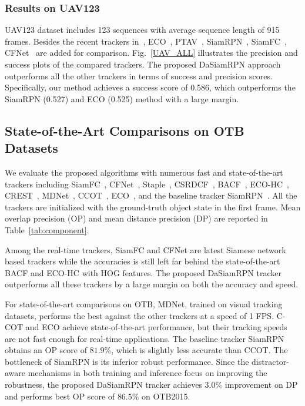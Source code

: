 \documentclass[runningheads]{llncs}
\begin{document}
\subsubsection{Results on UAV123}
UAV123 dataset includes 123 sequences with average sequence length of 915 frames. Besides the recent trackers in~\cite{UAV}, ECO~\cite{ECO}, PTAV~\cite{PTAV}, SiamRPN~\cite{SiamRPN}, SiamFC~\cite{SiamFC}, CFNet~\cite{CFNet} are added for comparison. Fig.~\ref{UAV_ALL} illustrates the precision and success plots of the compared trackers. The proposed DaSiamRPN approach outperforms all the other trackers in terms of success and precision scores. Specifically, our method achieves a success score of 0.586, which outperforms the SiamRPN (0.527) and ECO (0.525) method with a large margin.


\subsection{State-of-the-Art Comparisons on OTB Datasets}

\label{sect:otb}

We evaluate the proposed algorithms with numerous fast and state-of-the-art trackers including SiamFC~\cite{SiamFC}, CFNet~\cite{CFNet}, Staple~\cite{Staple}, CSRDCF~\cite{CSRDCF}, BACF~\cite{BACF}, ECO-HC~\cite{ECO}, CREST~\cite{CREST}, MDNet~\cite{MDNet}, CCOT~\cite{CCOT}, ECO~\cite{ECO}, and the baseline tracker SiamRPN~\cite{SiamRPN}. All the trackers are initialized with the ground-truth object state in the first frame. Mean overlap precision (OP) and mean distance precision (DP) are reported in Table~\ref{tab:component}.

Among the real-time trackers, SiamFC and CFNet are latest Siamese network based trackers while the accuracies is still left far behind the state-of-the-art BACF and ECO-HC with HOG features. The proposed DaSiamRPN tracker outperforms all these trackers by a large margin on both the accuracy and speed.

For state-of-the-art comparisons on OTB, MDNet, trained on visual tracking datasets, performs the best against the other trackers at a speed of 1 FPS. C-COT and ECO achieve state-of-the-art performance, but their tracking speeds are not fast enough for real-time applications. The baseline tracker SiamRPN obtains an OP score of $81.9\%$, which is slightly less accurate than CCOT. The bottleneck of SiamRPN is its inferior robust performance. Since the distractor-aware mechanisms in both training and inference focus on improving the robustness, the proposed DaSiamRPN tracker achieves $3.0\%$ improvement on DP and performs best OP score of $86.5\%$ on OTB2015.
\end{document}
